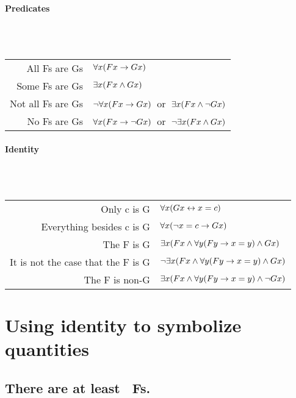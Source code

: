 \paragraph{Predicates}~\\

\hspace{1cm}~\begin{tabular}{rl} \toprule
All Fs are Gs & $\forall x(Fx \rightarrow Gx)$\\
Some Fs are Gs & $\exists x(Fx \wedge Gx)$\\
Not all Fs are Gs & $\neg\forall x(Fx \rightarrow Gx)$\ or\ $\exists x(Fx \wedge \neg Gx)$\\
No Fs are Gs & $\forall x(Fx \rightarrow\neg Gx)$\ or\ $\neg\exists x(Fx \wedge Gx)$\\
\bottomrule\end{tabular}

\newpage\paragraph{Identity}~\\

\hspace{1cm}~\begin{tabular}{rl} \toprule
Only c is G & $\forall x(Gx \leftrightarrow x=c)$\\
Everything besides c is G & $\forall x(\neg x = c \rightarrow Gx)$\\
The F is G & $\exists x(Fx \wedge \forall y(Fy \rightarrow x=y) \wedge Gx)$\\
It is not the case that the F is G & $\neg\exists x(Fx \wedge \forall y(Fy \rightarrow x=y) \wedge Gx)$\\
The F is non-G & $\exists x(Fx \wedge \forall y(Fy \rightarrow x=y) \wedge \neg Gx)$\\\bottomrule
\end{tabular}

\section*{Using identity to symbolize quantities}

\subsection*{There are at least \blank\ Fs.}
\label{summary.atleast}

